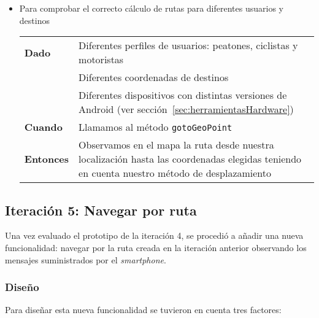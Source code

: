\begin{itemize}
  \item Para comprobar el correcto cálculo de rutas para diferentes usuarios y destinos

  \begin{tabular}{p{}p{}}
    \hline
    \textbf{Dado}     & Diferentes perfiles de usuarios: peatones, ciclistas y motoristas \\
                      & Diferentes coordenadas de destinos \\
                      & Diferentes dispositivos con distintas versiones de Android (ver
                        sección~\ref{sec:herramientasHardware}) \\
    \textbf{Cuando}   & Llamamos al método \texttt{gotoGeoPoint} \\
    \textbf{Entonces} & Observamos en el mapa la ruta desde nuestra localización hasta las
                        coordenadas elegidas teniendo en cuenta nuestro método de desplazamiento \\
    \hline
  \end{tabular}
\end{itemize}

\subsection{Iteración 5: Navegar por ruta}

Una vez evaluado el prototipo de la iteración 4, se procedió a añadir una nueva funcionalidad:
navegar por la ruta creada en la iteración anterior observando los mensajes suministrados por el
\emph{smartphone}.

\subsubsection{Diseño}

Para diseñar esta nueva funcionalidad se tuvieron en cuenta tres factores:

